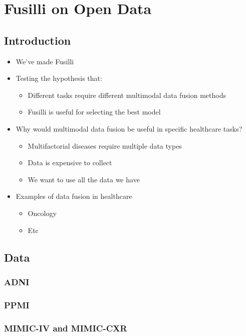 \chapter{Fusilli on Open Data}
\label{fusilli_on_open_data}

\section{Introduction}
\begin{itemize}
    \item We've made Fusilli
    \item Testing the hypothesis that:
    \begin{itemize}
        \item Different tasks require different multimodal data fusion methods
        \item Fusilli is useful for selecting the best model
    \end{itemize}
    \item Why would multimodal data fusion be useful in specific healthcare tasks?
    \begin{itemize}
        \item Multifactorial diseases require multiple data types
        \item Data is expensive to collect
        \item We want to use all the data we have
    \end{itemize}
    \item Examples of data fusion in healthcare
    \begin{itemize}
        \item Oncology
        \item Etc
    \end{itemize}
\end{itemize}

\section{Data}
\subsection{ADNI}
\subsection{PPMI}
\subsection{MIMIC-IV and MIMIC-CXR}

